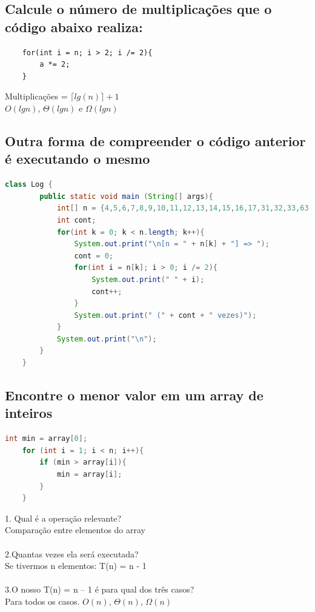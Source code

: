 \documentclass[12pt]{article}
\begin{document}
{\subsection{Calcule o número de multiplicações que o código abaixo realiza:}
\begin{lstlisting}
    for(int i = n; i > 2; i /= 2){
        a *= 2;
    }
\end{lstlisting}
Multiplicações = $\lceil lg(n) \rceil + 1$\\ $O(lg n)$, $\Theta(lg n)$ e $\Omega(lg n)$

\subsection{Outra forma de compreender o código anterior é executando o mesmo}
\begin{lstlisting}[language=Java]
    class Log {
        public static void main (String[] args){
            int[] n = {4,5,6,7,8,9,10,11,12,13,14,15,16,17,31,32,33,63,64,65};
            int cont;
            for(int k = 0; k < n.length; k++){
                System.out.print("\n[n = " + n[k] + "] => ");
                cont = 0;
                for(int i = n[k]; i > 0; i /= 2){            
                    System.out.print(" " + i);
                    cont++;
                }
                System.out.print(" (" + cont + " vezes)");
            }
            System.out.print("\n");
        }
    }
\end{lstlisting}

\subsection{Encontre o menor valor em um array de inteiros}
\begin{lstlisting}[language=Java]
    int min = array[0];
    for (int i = 1; i < n; i++){
        if (min > array[i]){
            min = array[i];
        }
    }
\end{lstlisting}
1. Qual é a operação relevante?\\
Comparação entre elementos do array\\\\
2.Quantas vezes ela será executada?\\
Se tivermos n elementos: T(n) = n - 1\\\\
3.O nosso T(n) = n – 1 é para qual dos três casos?\\
Para todos os casos. $O(n)$, $\Theta(n)$, $\Omega(n)$\\

}
\end{document}
